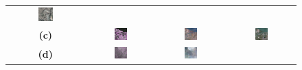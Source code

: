 \begin{figure}[h!]
\begin{tabular}{c *{3}{c}}
        \includegraphics[width=0.2\textwidth, height=0.2\textheight, keepaspectratio]{img/qualitative-20/sample_3/gt.png} \\
        \textbf{(c)} &
        \includegraphics[width=0.2\textwidth, height=0.2\textheight, keepaspectratio]{img/qualitative-20/sample_5/sar.png} &
        \includegraphics[width=0.2\textwidth, height=0.2\textheight, keepaspectratio]{img/qualitative-20/sample_5/gen.png} &
        \includegraphics[width=0.2\textwidth, height=0.2\textheight, keepaspectratio]{img/qualitative-20/sample_5/gt.png} \\
        \textbf{(d)} &
        \includegraphics[width=0.2\textwidth, height=0.2\textheight, keepaspectratio]{img/qualitative-20/sample_7/sar.png} &
        \includegraphics[width=0.2\textwidth, height=0.2\textheight, keepaspectratio]{img/qualitative-20/sample_7/gen.png} &

\end{tabular}
\end{figure}
